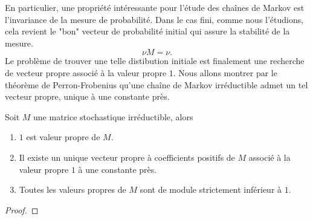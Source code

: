 \documentclass[../main.tex]{subfiles}
\begin{document}
En particulier, une propriété intéressante pour l'étude des chaînes de Markov est l'invariance de la mesure de probabilité.
Dans le cas fini, comme nous l'étudions, cela revient le "bon" vecteur de probabilité initial qui assure la stabilité de la mesure.
\begin{equation}
    \nu M = \nu.
\end{equation}
Le problème de trouver une telle distibution initiale est finalement une recherche de vecteur propre associé à la valeur propre \(1\).
Nous allons montrer par le théorème de Perron-Frobenius qu'une chaîne de Markov irréductible admet un tel vecteur propre, unique à une constante près.
\begin{theorem} Soit \(M\) une matrice stochastique irréductible, alors
    \begin{enumerate}
        \item \(1\) est valeur propre de \(M\).
        \item Il existe un unique vecteur propre à coefficients positifs de \(M\) associé à la valeur propre \(1\) à une constante près.
        \item Toutes les valeurs propres de \(M\) sont de module strictement inférieur à \(1\).
    \end{enumerate}
\end{theorem}
\begin{proof}
\end{proof}
\end{document}
